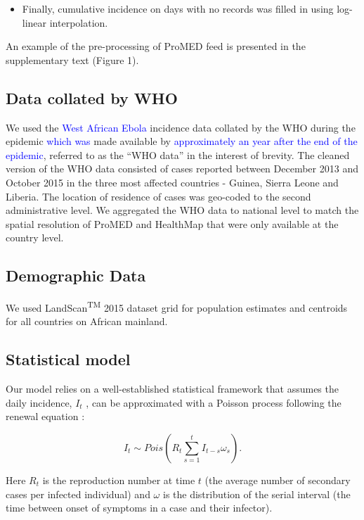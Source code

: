 \documentclass[9pt,twocolumn,twoside,lineno]{pnas-new}
\newcommand{\sangeeta}[1]{\textcolor{blue}{#1}}
\begin{document}
{\begin{itemize}
\item
  Finally, cumulative incidence on days with no records was filled in
  using log-linear interpolation.
\end{itemize}

An example of the pre-processing of ProMED feed is presented in the
supplementary text (Figure 1).

\subsection*{Data collated by WHO}\label{data-collated-by-who}

We used the \sangeeta{West African Ebola} incidence data collated by the WHO during the 
epidemic \sangeeta{which was} made available by \cite{garske20160308}
\sangeeta{approximately an year after the end of the epidemic}, referred to as
the ``WHO data'' in the interest of brevity. The cleaned version of the
WHO data consisted of cases reported between December 2013 and October
2015 in the three most affected countries - Guinea, Sierra Leone and
Liberia. The location of residence of cases was geo-coded to the second
administrative level. We aggregated the WHO data to national level to
match the spatial resolution of ProMED and HealthMap that were only
available at the country level.

\subsection*{Demographic Data}\label{demographic-data}

We used LandScan\textsuperscript{TM} 2015 dataset grid \cite{landscan}
for population estimates and centroids for all countries on African
mainland.

\subsection*{Statistical model}\label{statistical-model}

Our model relies on a well-established statistical framework that
assumes the daily incidence, \(I_t\) , can be approximated with a
Poisson process following the renewal equation
\cite{fraser2007estimating}:

\begin{equation*}
  I_{t} \sim 
  Pois
  \left( 
    R_t \sum_{s = 1}^{t}{I_{t - s}\omega_s}
  \right).
\end{equation*}

Here \(R_t\) is the reproduction number at time \(t\) (the average
number of secondary cases per infected individual) and \(\omega\) is the
distribution of the serial interval (the time between onset of symptoms
in a case and their infector).

}
\end{document}
